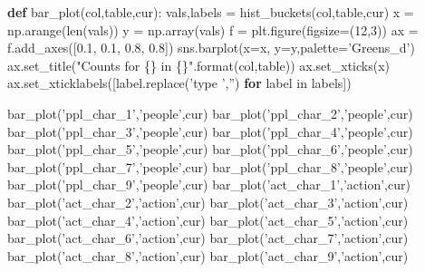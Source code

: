 \documentclass[]{report}
\newenvironment{Shaded}{}{}
\newcommand{\KeywordTok}[1]{\textcolor[rgb]{0.00,0.44,0.13}{\textbf{{#1}}}}
\newcommand{\DataTypeTok}[1]{\textcolor[rgb]{0.56,0.13,0.00}{{#1}}}
\newcommand{\DecValTok}[1]{\textcolor[rgb]{0.25,0.63,0.44}{{#1}}}
\newcommand{\FloatTok}[1]{\textcolor[rgb]{0.25,0.63,0.44}{{#1}}}
\newcommand{\StringTok}[1]{\textcolor[rgb]{0.25,0.44,0.63}{{#1}}}
\newcommand{\NormalTok}[1]{{#1}}
\begin{document}
\begin{Shaded}
\begin{Highlighting}[]
\KeywordTok{def} \NormalTok{bar_plot(col,table,cur):}
    \NormalTok{vals,labels = hist_buckets(col,table,cur)}
    \NormalTok{x = np.arange(}\DataTypeTok{len}\NormalTok{(vals))}
    \NormalTok{y = np.array(vals)}
    \NormalTok{f = plt.figure(figsize=(}\DecValTok{12}\NormalTok{,}\DecValTok{3}\NormalTok{))}
    \NormalTok{ax = f.add_axes([}\FloatTok{0.1}\NormalTok{, }\FloatTok{0.1}\NormalTok{, }\FloatTok{0.8}\NormalTok{, }\FloatTok{0.8}\NormalTok{])}
    \NormalTok{sns.barplot(x=x, y=y,palette=}\StringTok{'Greens_d'}\NormalTok{)}
    \NormalTok{ax.set_title(}\StringTok{"Counts for \{\} in \{\}"}\NormalTok{.}\DataTypeTok{format}\NormalTok{(col,table))}
    \NormalTok{ax.set_xticks(x)}
    \NormalTok{ax.set_xticklabels([label.replace(}\StringTok{'type '}\NormalTok{,}\StringTok{''}\NormalTok{) }\KeywordTok{for} \NormalTok{label in labels])}
\end{Highlighting}
\end{Shaded}

\pagebreak

\begin{Shaded}
\begin{Highlighting}[]
\NormalTok{bar_plot(}\StringTok{'ppl_char_1'}\NormalTok{,}\StringTok{'people'}\NormalTok{,cur)}
\NormalTok{bar_plot(}\StringTok{'ppl_char_2'}\NormalTok{,}\StringTok{'people'}\NormalTok{,cur)}
\NormalTok{bar_plot(}\StringTok{'ppl_char_3'}\NormalTok{,}\StringTok{'people'}\NormalTok{,cur)}
\NormalTok{bar_plot(}\StringTok{'ppl_char_4'}\NormalTok{,}\StringTok{'people'}\NormalTok{,cur)}
\NormalTok{bar_plot(}\StringTok{'ppl_char_5'}\NormalTok{,}\StringTok{'people'}\NormalTok{,cur)}
\NormalTok{bar_plot(}\StringTok{'ppl_char_6'}\NormalTok{,}\StringTok{'people'}\NormalTok{,cur)}
\NormalTok{bar_plot(}\StringTok{'ppl_char_7'}\NormalTok{,}\StringTok{'people'}\NormalTok{,cur)}
\NormalTok{bar_plot(}\StringTok{'ppl_char_8'}\NormalTok{,}\StringTok{'people'}\NormalTok{,cur)}
\NormalTok{bar_plot(}\StringTok{'ppl_char_9'}\NormalTok{,}\StringTok{'people'}\NormalTok{,cur)}
\NormalTok{bar_plot(}\StringTok{'act_char_1'}\NormalTok{,}\StringTok{'action'}\NormalTok{,cur)}
\NormalTok{bar_plot(}\StringTok{'act_char_2'}\NormalTok{,}\StringTok{'action'}\NormalTok{,cur)}
\NormalTok{bar_plot(}\StringTok{'act_char_3'}\NormalTok{,}\StringTok{'action'}\NormalTok{,cur)}
\NormalTok{bar_plot(}\StringTok{'act_char_4'}\NormalTok{,}\StringTok{'action'}\NormalTok{,cur)}
\NormalTok{bar_plot(}\StringTok{'act_char_5'}\NormalTok{,}\StringTok{'action'}\NormalTok{,cur)}
\NormalTok{bar_plot(}\StringTok{'act_char_6'}\NormalTok{,}\StringTok{'action'}\NormalTok{,cur)}
\NormalTok{bar_plot(}\StringTok{'act_char_7'}\NormalTok{,}\StringTok{'action'}\NormalTok{,cur)}
\NormalTok{bar_plot(}\StringTok{'act_char_8'}\NormalTok{,}\StringTok{'action'}\NormalTok{,cur)}
\NormalTok{bar_plot(}\StringTok{'act_char_9'}\NormalTok{,}\StringTok{'action'}\NormalTok{,cur)}
\end{Highlighting}
\end{Shaded}
\end{document}
